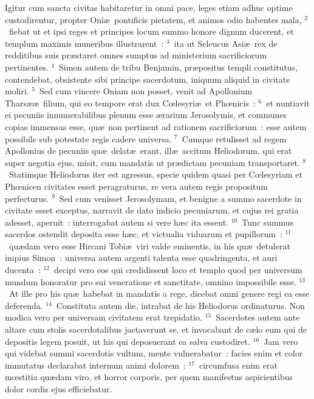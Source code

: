 \lettrine[lines=3,image=true,loversize=0.05,lraise=-0.03]{I}{}gitur cum sancta civitas habitaretur in omni pace, leges etiam adhuc optime custodirentur, propter Oni\ae\ pontificis pietatem, et animos odio habentes mala,
${}^{2}$~fiebat ut et ipsi reges et principes locum summo honore dignum ducerent, et templum maximis muneribus illustrarent~:
${}^{3}$~ita ut Seleucus Asi\ae\ rex de redditibus suis pr\ae staret omnes sumptus ad ministerium sacrificiorum pertinentes.
${}^{4}$~Simon autem de tribu Benjamin, pr\ae positus templi constitutus, contendebat, obsistente sibi principe sacerdotum, iniquum aliquid in civitate moliri.
${}^{5}$~Sed cum vincere Oniam non posset, venit ad Apollonium Thars\ae \ae\ filium, qui eo tempore erat dux Cœlesyri\ae\ et Phœnicis~:
${}^{6}$~et nuntiavit ei pecuniis innumerabilibus plenum esse \ae rarium Jerosolymis, et communes copias immensas esse, qu\ae\ non pertinent ad rationem sacrificiorum~: esse autem possibile sub potestate regis cadere universa.
${}^{7}$~Cumque retulisset ad regem Apollonius de pecuniis qu\ae\ delat\ae\ erant, ill\ae\ accitum Heliodorum, qui erat super negotia ejus, misit, cum mandatis ut pr\ae dictam pecuniam transportaret.
${}^{8}$~Statimque Heliodorus iter est agressus, specie quidem quasi per Cœlesyriam et Phœnicen civitates esset peragraturus, re vera autem regis propositum perfecturus.
${}^{9}$~Sed cum venisset Jerosolymam, et benigne a summo sacerdote in civitate esset exceptus, narravit de dato indicio pecuniarum, et cujus rei gratia adesset, aperuit~: interrogabat autem si vere h\ae c ita essent.
${}^{10}$~Tunc summus sacerdos ostendit deposita esse h\ae c, et victualia viduarum et pupillorum~:
${}^{11}$~qu\ae dam vero esse Hircani Tobi\ae\ viri valde eminentis, in his qu\ae\ detulerat impius Simon~: universa autem argenti talenta esse quadringenta, et auri ducenta~:
${}^{12}$~decipi vero eos qui credidissent loco et templo quod per universum mundum honoratur pro sui veneratione et sanctitate, omnino impossibile esse.
${}^{13}$~At ille pro his qu\ae\ habebat in mandatis a rege, dicebat omni genere regi ea esse deferenda.
${}^{14}$~Constituta autem die, intrabat de his Heliodorus ordinaturus. Non modica vero per universam civitatem erat trepidatio.
${}^{15}$~Sacerdotes autem ante altare cum stolis sacerdotalibus jactaverunt se, et invocabant de c\ae lo eum qui de depositis legem posuit, ut his qui deposuerant ea salva custodiret.
${}^{16}$~Jam vero qui videbat summi sacerdotis vultum, mente vulnerabatur~: facies enim et color immutatus declarabat internum animi dolorem~:
${}^{17}$~circumfusa enim erat mœstitia qu\ae dam viro, et horror corporis, per quem manifestus aspicientibus dolor cordis ejus efficiebatur.
